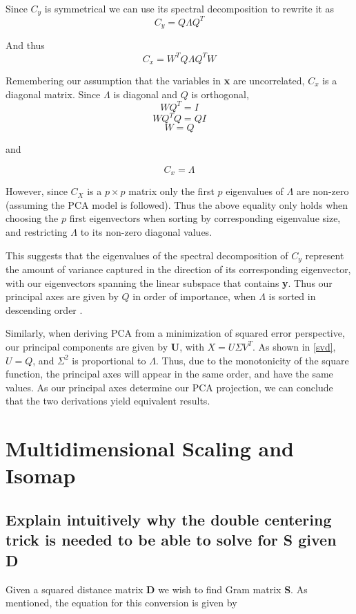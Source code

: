 \documentclass[11pt,a4paper,landscape]{article}
\begin{document}
Since $ C_{y} $ is symmetrical we can use its spectral decomposition to rewrite it as
$$ C_{y} = Q\Lambda Q^{T} $$

And thus
$$C_{x} = W^{T}Q\Lambda Q^{T}W$$

Remembering our assumption that the variables in \textbf{x} are uncorrelated,  $C_{x}$ is a diagonal matrix. Since $\Lambda$ is diagonal and $Q$ is orthogonal, 
$$WQ^{T} = I$$
$$WQ^{T}Q=QI$$
$$W= Q$$

and

$$ C_{x} = \Lambda $$

However, since $C_{X}$ is a $p\times p$ matrix only the first $p$ eigenvalues of $\Lambda$ are non-zero (assuming the PCA model is followed). Thus the above equality only holds when choosing the $p$ first eigenvectors when sorting by corresponding eigenvalue size, and restricting $\Lambda$ to its non-zero diagonal values. \newline

This suggests that the eigenvalues of the spectral decomposition of $C_{y}$ represent the amount of variance captured in the direction of its corresponding eigenvector, with our eigenvectors spanning the linear subspace that contains \textbf{y}. Thus our principal axes are given by $Q$ in order of importance, when $\Lambda$ is sorted in descending order \cite{book}.\newline

Similarly, when deriving PCA from a minimization of squared error perspective, our principal components are given by \textbf{U}, with $X = U\Sigma V^{T}$. As shown in \ref{svd}, $U = Q$, and $\Sigma^2$ is proportional to $\Lambda$. Thus, due to the monotonicity of the square function, the principal axes will appear in the same order, and have the same values. As our principal axes determine our PCA projection, we can conclude that the two derivations yield equivalent results\cite{book}.



\section{Multidimensional Scaling and Isomap}

\subsection{Explain intuitively why the double centering trick is needed to be able to solve for S given D}

Given a squared distance matrix \textbf{D} we wish to find Gram matrix \textbf{S}. As mentioned, the equation for this conversion is given by
\end{document}
